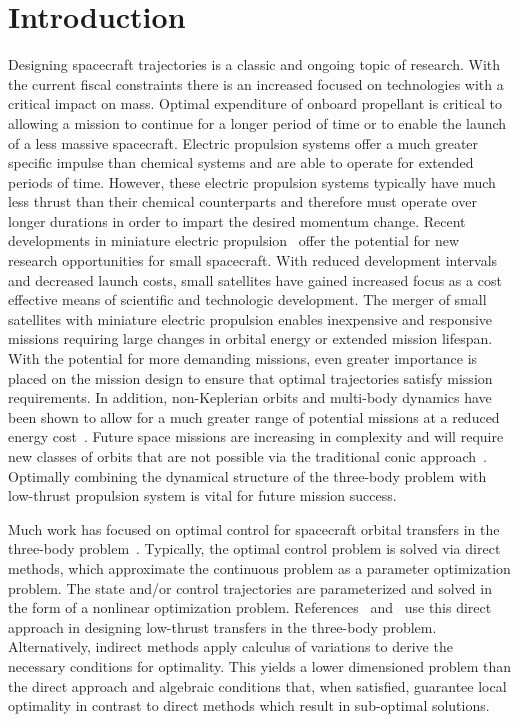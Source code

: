 \documentclass[letterpaper, preprint, paper,11pt]{AAS}	%
\begin{document}
\section{Introduction}\label{sec:introduction}
Designing spacecraft trajectories is a classic and ongoing topic of research.
With the current fiscal constraints there is an increased focused on technologies with a critical impact on mass.
Optimal expenditure of onboard propellant is critical to allowing a mission to continue for a longer period of time or to enable the launch of a less massive spacecraft.
Electric propulsion systems offer a much greater specific impulse than chemical systems and are able to operate for extended periods of time.
However, these electric propulsion systems typically have much less thrust than their chemical counterparts and therefore must operate over longer durations in order to impart the desired momentum change.
Recent developments in miniature electric propulsion~\cite{haque2013} offer the potential for new research opportunities for small spacecraft.
With reduced development intervals and decreased launch costs, small satellites have gained increased focus as a cost effective means of scientific and technologic development. 
The merger of small satellites with miniature electric propulsion enables inexpensive and responsive missions requiring large changes in orbital energy or extended mission lifespan.
With the potential for more demanding missions, even greater importance is placed on the mission design to ensure that optimal trajectories satisfy mission requirements. 
In addition, non-Keplerian orbits and multi-body dynamics have been shown to allow for a much greater range of potential missions at a reduced energy cost~\cite{koon2000}.
Future space missions are increasing in complexity and will require new classes of orbits that are not possible via the traditional conic approach~\cite{ross2006,gomez2001}.
Optimally combining the dynamical structure of the three-body problem with low-thrust propulsion system is vital for future mission success.

Much work has focused on optimal control for spacecraft orbital transfers in the three-body problem~\cite{mingotti2011,grebow2011}.
Typically, the optimal control problem is solved via direct methods, which approximate the continuous problem as a parameter optimization problem.
The state and/or control trajectories are parameterized and solved in the form of a nonlinear optimization problem.
References~ and~ use this direct approach in designing low-thrust transfers in the three-body problem.
Alternatively, indirect methods apply calculus of variations to derive the necessary conditions for optimality. 
This yields a lower dimensioned problem than the direct approach and algebraic conditions that, when satisfied, guarantee local optimality in contrast to direct methods which result in sub-optimal solutions.
\end{document}
